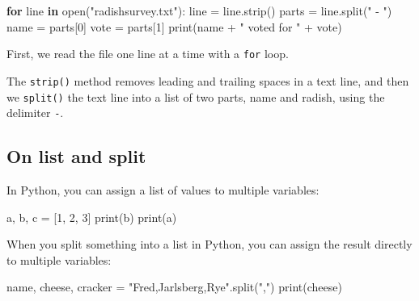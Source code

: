 \documentclass[
  letterpaper,
]{scrbook}
\newenvironment{Shaded}{\begin{snugshade}}{\end{snugshade}}
\newcommand{\BuiltInTok}[1]{\textcolor[rgb]{0.00,0.23,0.31}{#1}}
\newcommand{\ControlFlowTok}[1]{\textcolor[rgb]{0.00,0.23,0.31}{\textbf{#1}}}
\newcommand{\DecValTok}[1]{\textcolor[rgb]{0.68,0.00,0.00}{#1}}
\newcommand{\KeywordTok}[1]{\textcolor[rgb]{0.00,0.23,0.31}{\textbf{#1}}}
\newcommand{\NormalTok}[1]{\textcolor[rgb]{0.00,0.23,0.31}{#1}}
\newcommand{\OperatorTok}[1]{\textcolor[rgb]{0.37,0.37,0.37}{#1}}
\newcommand{\StringTok}[1]{\textcolor[rgb]{0.13,0.47,0.30}{#1}}
\begin{document}
\begin{Shaded}
\begin{Highlighting}[]
\ControlFlowTok{for}\NormalTok{ line }\KeywordTok{in} \BuiltInTok{open}\NormalTok{(}\StringTok{"radishsurvey.txt"}\NormalTok{):}
\NormalTok{   line }\OperatorTok{=}\NormalTok{ line.strip()}
\NormalTok{   parts }\OperatorTok{=}\NormalTok{ line.split(}\StringTok{" {-} "}\NormalTok{)}
\NormalTok{   name }\OperatorTok{=}\NormalTok{ parts[}\DecValTok{0}\NormalTok{]}
\NormalTok{   vote }\OperatorTok{=}\NormalTok{ parts[}\DecValTok{1}\NormalTok{]}
   \BuiltInTok{print}\NormalTok{(name }\OperatorTok{+} \StringTok{" voted for "} \OperatorTok{+}\NormalTok{ vote)}
\end{Highlighting}
\end{Shaded}

First, we read the file one line at a time with a \texttt{for} loop.

The \texttt{strip()} method removes leading and trailing spaces in a
text line, and then we \texttt{split()} the text line into a list of two
parts, name and radish, using the delimiter \texttt{-}.

\subsection*{On list and split}\label{on-list-and-split}

In Python, you can assign a list of values to multiple variables:

\begin{Shaded}
\begin{Highlighting}[]
\NormalTok{a, b, c }\OperatorTok{=}\NormalTok{ [}\DecValTok{1}\NormalTok{, }\DecValTok{2}\NormalTok{, }\DecValTok{3}\NormalTok{]}
\BuiltInTok{print}\NormalTok{(b)}
\BuiltInTok{print}\NormalTok{(a)}
\end{Highlighting}
\end{Shaded}

When you split something into a list in Python, you can assign the
result directly to multiple variables:

\begin{Shaded}
\begin{Highlighting}[]
\NormalTok{name, cheese, cracker }\OperatorTok{=} \StringTok{"Fred,Jarlsberg,Rye"}\NormalTok{.split(}\StringTok{","}\NormalTok{)}
\BuiltInTok{print}\NormalTok{(cheese)}
\end{Highlighting}
\end{Shaded}
\end{document}
